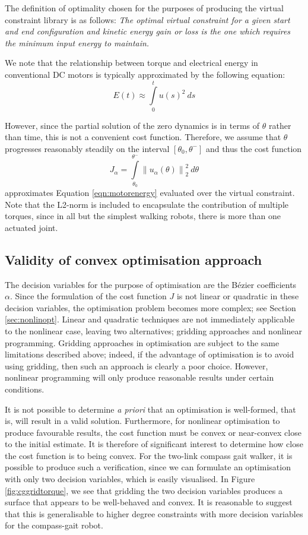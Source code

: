 The definition of optimality chosen for the purposes of producing the virtual constraint library is as follows:
\emph{The optimal virtual constraint for a given start and end configuration and kinetic energy gain or loss is the one which requires the minimum input energy to maintain.}

We note that the relationship between torque and electrical energy in conventional DC motors is typically approximated by the following equation:
\begin{equation} \label{eqn:motorenergy}
	E(t) \approx \int\limits_0^t u(s)^2 ~ ds
\end{equation}

However, since the partial solution of the zero dynamics is in terms of $\theta$ rather than time, this is not a convenient cost function. Therefore, we assume that $\theta$ progresses reasonably steadily on the interval $[\theta_0,\theta^-]$ and thus the cost function
\begin{equation}
	J_\alpha = \int\limits_{\theta_0}^{\theta^-} \left\lVert u_\alpha(\theta) \right\rVert_2^2 ~ d\theta
\end{equation}
approximates Equation \ref{eqn:motorenergy} evaluated over the virtual constraint. Note that the L2-norm is included to encapsulate the contribution of multiple torques, since in all but the simplest walking robots, there is more than one actuated joint.

\subsection{Validity of convex optimisation approach}
The decision variables for the purpose of optimisation are the Bézier coefficients $\alpha$. Since the formulation of the cost function $J$ is not linear or quadratic in these decision variables, the optimisation problem becomes more complex; see Section \ref{sec:nonlinopt}. Linear and quadratic techniques are not immediately applicable to the nonlinear case, leaving two alternatives; gridding approaches and nonlinear programming. Gridding approaches in optimisation are subject to the same limitations described above; indeed, if the advantage of optimisation is to avoid using gridding, then such an approach is clearly a poor choice. However, nonlinear programming will only produce reasonable results under certain conditions.

It is not possible to determine \textit{a priori} that an optimisation is well-formed, that is, will result in a valid solution. Furthermore, for nonlinear optimisation to produce favourable results, the cost function must be convex or near-convex close to the initial estimate. It is therefore of significant interest to determine how close the cost function is to being convex. For the two-link compass gait walker, it is possible to produce such a verification, since we can formulate an optimisation with only two decision variables, which is easily visualised. In Figure \ref{fig:cggridtorque}, we see that gridding the two decision variables produces a surface that appears to be well-behaved and convex. It is reasonable to suggest that this is generalisable to higher degree constraints with more decision variables for the compass-gait robot.

